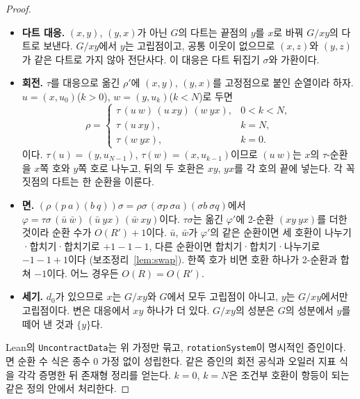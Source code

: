 \begin{proof}
\leanok
\begin{itemize}
  \item \textbf{다트 대응.} \((x,y)\), \((y,x)\)가 아닌 \(G\)의 다트는 끝점의 \(y\)를 \(x\)로 바꿔 \(G/xy\)의 다트로
        보낸다. \(G/xy\)에서 \(y\)는 고립점이고, 공통 이웃이 없으므로 \((x,z)\)와 \((y,z)\)가 같은 다트로 가지 않아
        전단사다. 이 대응은 다트 뒤집기 \(\sigma\)와 가환이다.
  \item \textbf{회전.} \(\tau\)를 대응으로 옮긴 \(\rho'\)에 \((x,y)\), \((y,x)\)를 고정점으로 붙인 순열이라 하자.
        \(u = (x, u_0)\)(\(k > 0\)), \(w = (y, u_k)\)(\(k < N\))로 두면
        \[
          \rho = \begin{cases}
            \tau\,(u\ w)\,(u\ xy)\,(w\ yx), & 0 < k < N,\\
            \tau\,(u\ xy), & k = N,\\
            \tau\,(w\ yx), & k = 0.
          \end{cases}
        \]
        이다. \(\tau(u) = (y, u_{N-1})\), \(\tau(w) = (x, u_{k-1})\)이므로 \((u\ w)\)는 \(x\)의 \(\tau\)-순환을 \(x\)쪽 호와
        \(y\)쪽 호로 나누고, 뒤의 두 호환은 \(xy\), \(yx\)를 각 호의 끝에 넣는다. 각 꼭짓점의 다트는 한 순환을 이룬다.
  \item \textbf{면.} \((\rho\,(p\ a)(b\ q))\sigma = \rho\sigma\,(\sigma p\ \sigma a)(\sigma b\ \sigma q)\)에서
        \(\varphi = \tau\sigma\,(\bar u\ \bar w)\,(\bar u\ yx)\,(\bar w\ xy)\)이다. \(\tau\sigma\)는 옮긴 \(\varphi'\)에 2-순환
        \((xy\ yx)\)를 더한 것이라 순환 수가 \(O(R') + 1\)이다. \(\bar u\), \(\bar w\)가 \(\varphi'\)의 같은 순환이면 세 호환이
        나누기·합치기·합치기로 \(+1-1-1\), 다른 순환이면 합치기·합치기·나누기로 \(-1-1+1\)이다
        (보조정리~\ref{lem:swap}). 한쪽 호가 비면 호환 하나가 2-순환과 합쳐 \(-1\)이다. 어느 경우든 \(O(R) = O(R')\).
  \item \textbf{세기.} \(d_0\)가 있으므로 \(x\)는 \(G/xy\)와 \(G\)에서 모두 고립점이 아니고, \(y\)는 \(G/xy\)에서만 고립점이다.
        변은 대응에서 \(xy\) 하나가 더 있다. \(G/xy\)의 성분은 \(G\)의 성분에서 \(y\)를 떼어 낸 것과 \(\{y\}\)다.
\end{itemize}
Lean의 \texttt{UncontractData}는 위 가정만 묶고, \texttt{rotationSystem}이 명시적인 증인이다.
면 순환 수 식은 종수 0 가정 없이 성립한다. 같은 증인의 회전 공식과 오일러 지표 식을 각각 증명한 뒤
존재형 정리를 얻는다. \(k=0\), \(k=N\)은 조건부 호환이 항등이 되는 같은 정의 안에서 처리한다.
\end{proof}

